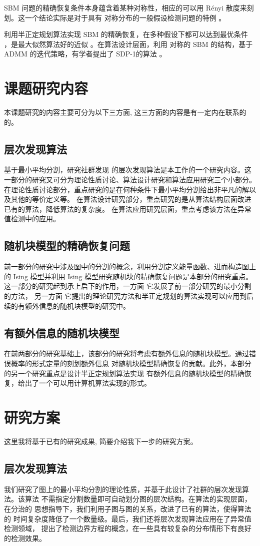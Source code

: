\documentclass{ctexart}
\begin{document}
SBM 问题的精确恢复条件本身蕴含着某种对称性，相应的可以用 Rényi 散度来刻划。这一个结论实际是对于具有
对称分布的一般假设检测问题的特例 \cite{gao2018community}。

利用半正定规划算法实现 SBM 的精确恢复，在多种假设下都可以达到最优条件 \cite{hajek2016achieving}，是最大似然算法好的近似 。在算法设计层面，利用 对称的 SBM 的结构，基于 ADMM 的迭代策略，有学者提出了 SDP-1的算法 \cite{amini2018semidefinite}。
\section{课题研究内容}
本课题研究的内容主要可分为以下三方面, 这三方面的内容是有一定内在联系的
的。
\subsection{层次发现算法}
基于最小平均分割，研究社群发现
的层次发现算法是本工作的一个研究内容。这一部分的研究又可分为理论性质讨论、算法设计研究和算法应用研究三个小部分。
在理论性质讨论部分，重点研究的是在何种条件下最小平均分割给出非平凡的解以及其他的等价定义等。
在算法设计研究部分，重点研究的是从算法结构层面改进已有的算法，降低算法的复杂度。
在算法应用研究层面，重点考虑该方法在异常值检测中的应用。
\subsection{随机块模型的精确恢复问题}
前一部分的研究中涉及图中的分割的概念，利用分割定义能量函数、进而构造图上的 Ising 模型并利用
Ising 模型研究随机块的精确恢复问题是本部分的研究重点。这一部分的研究起到承上启下的作用，一方面
它发展了前一部分研究的最小分割的方法，
另一方面
它提出的理论研究方法和半正定规划的算法实现可以应用到后续的有额外信息的随机块模型的研究中。
\subsection{有额外信息的随机块模型}
在前两部分的研究基础上，该部分的研究将考虑有额外信息的随机块模型。通过错误概率的形式定量的刻划额外信息
对随机块模型精确恢复的贡献。此外，本部分的另一个研究重点是设计半正定规划算法实现
有额外信息的随机块模型的精确恢复，给出了一个可以用计算机算法实现的形式。
\section{研究方案}
这里我将基于已有的研究成果, 简要介绍我下一步的研究方案。
\subsection{层次发现算法}
我们研究了图上的最小平均分割的理论性质，并基于此设计了社群的层次发现算法。该算法
不需指定分割数量即可自动划分图的层次结构。在算法的实现层面，在分治的
思想指导下，我们利用子图与图的关系，改进了已有的算法，使得算法的
时间复杂度降低了一个数量级。最后，我们还将层次发现算法应用在了异常值检测领域，
提出了检测边界方程的概念，在一些具有较复杂的分布情形下有良好的检测效果。
\end{document}
